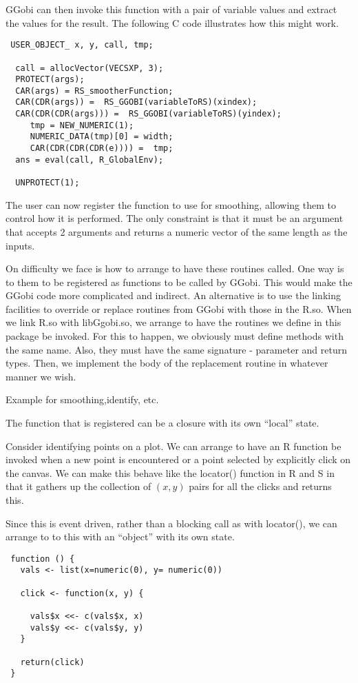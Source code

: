 GGobi can then invoke this function with a pair of variable values and
extract the values for the result.
The following C code illustrates how this might work.
\begin{verbatim}
 USER_OBJECT_ x, y, call, tmp;

  call = allocVector(VECSXP, 3);
  PROTECT(args);
  CAR(args) = RS_smootherFunction;
  CAR(CDR(args)) =  RS_GGOBI(variableToRS)(xindex);
  CAR(CDR(CDR(args))) =  RS_GGOBI(variableToRS)(yindex);
     tmp = NEW_NUMERIC(1);
     NUMERIC_DATA(tmp)[0] = width;
     CAR(CDR(CDR(CDR(e)))) =  tmp;
  ans = eval(call, R_GlobalEnv);

  UNPROTECT(1);
\end{verbatim}

The user can now register the function to use for smoothing, allowing
them to control how it is performed. The only constraint is that it
must be an argument that accepts 2 arguments and returns a numeric
vector of the same length as the inputs.



On difficulty we face is how to arrange to have these routines called.
One way is to them to be registered as functions to be called by
GGobi. This would make the GGobi code more complicated and indirect.
An alternative is to use the linking facilities to override or replace
routines from GGobi with those in the R.so.  When we link R.so with
libGgobi.so, we arrange to have the routines we define in this package
be invoked.  For this to happen, we obviously must define methods with
the same name. Also, they must have the same signature - parameter and
return types. Then, we implement the body of the replacement
routine in whatever manner we wish.



Example for smoothing,identify, etc.


The function that is registered can be a closure
with its own ``local'' state.


Consider identifying points on a plot.  We can arrange to have an R
function be invoked when a new point is encountered or a point
selected by explicitly click on the canvas.
We can make this behave like the locator() function
in R and S in that it gathers up the collection of 
$(x, y)$ pairs for all the clicks
and returns this.

Since this is event driven, rather than a blocking call as with
locator(), we can arrange to to this with an ``object'' with its own
state.
\begin{verbatim}
 function () {
   vals <- list(x=numeric(0), y= numeric(0))

   click <- function(x, y) {
    
     vals$x <<- c(vals$x, x)
     vals$y <<- c(vals$y, y)
   }

   return(click)
 }
\end{verbatim}



